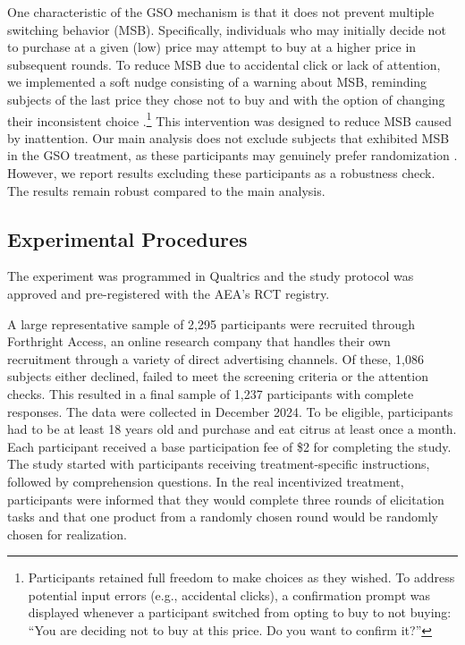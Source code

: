 \documentclass[12pt]{article}
\begin{document}
One characteristic of the GSO mechanism is that it does not prevent multiple switching behavior (MSB). Specifically, individuals who may initially decide not to purchase at a given (low) price may attempt to buy at a higher price in subsequent rounds. To reduce MSB due to accidental click or lack of attention, we implemented a soft nudge consisting of a warning about MSB, reminding subjects of the last price they chose not to buy and with the option of changing their inconsistent choice \citep{yu2021multiple}.\footnote{Participants retained full freedom to make choices as they wished. To address potential input errors (e.g., accidental clicks), a confirmation prompt was displayed whenever a participant switched from opting to buy to not buying: ``You are deciding not to buy at this price. Do you want to confirm it?''} 
This intervention was designed to reduce MSB caused by inattention. Our main analysis does not exclude subjects that exhibited MSB in the GSO treatment, as these participants may genuinely prefer randomization \citep{agranov2017stochastic}. However, we report results excluding these participants as a robustness check. The results remain robust compared to the main analysis.
    
\subsection{Experimental Procedures}
The experiment was programmed in Qualtrics and the study protocol was approved %
and pre-registered with the AEA's RCT registry.

A large representative sample of 2,295 participants were recruited through Forthright Access, an online research company that handles their own recruitment through a variety of direct advertising channels. Of these, 1,086 subjects either declined, failed to meet the screening criteria or the attention checks. This resulted in a final sample of 1,237 participants with complete responses. The data were collected in December 2024. To be eligible, participants had to be at least 18 years old and purchase and eat citrus at least once a month. 
Each participant received a base participation fee of \$2 for completing the study. The study started with participants receiving treatment-specific instructions, followed by comprehension questions. In the real incentivized treatment, participants were informed that they would complete three rounds of elicitation tasks and that one product from a randomly chosen round would be randomly chosen for realization. 
\end{document}
